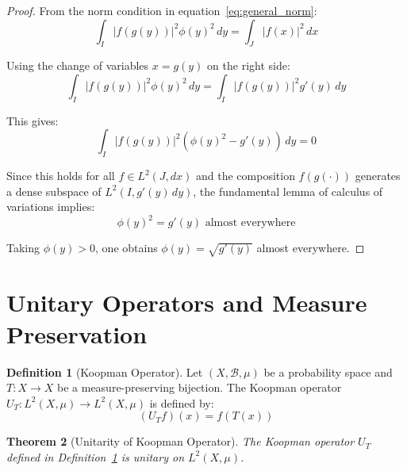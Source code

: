 \documentclass[11pt]{article}
\theoremstyle{theorem}
\newtheorem{theorem}{Theorem}[section]
\theoremstyle{definition}
\newtheorem{definition}[theorem]{Definition}
\begin{document}
\begin{proof}
From the norm condition in equation~\eqref{eq:general_norm}:
\begin{equation}
\label{eq:phi_condition}
\int_I |f(g(y))|^2 \phi(y)^2 \, dy = \int_J |f(x)|^2 \, dx
\end{equation}

Using the change of variables $x = g(y)$ on the right side:
\begin{equation}
\label{eq:phi_comparison}
\int_I |f(g(y))|^2 \phi(y)^2 \, dy = \int_I |f(g(y))|^2 g'(y) \, dy
\end{equation}

This gives:
\begin{equation}
\label{eq:phi_difference}
\int_I |f(g(y))|^2 (\phi(y)^2 - g'(y)) \, dy = 0
\end{equation}

Since this holds for all $f \in L^2(J, dx)$ and the composition $f(g(\cdot))$ generates a dense subspace of $L^2(I, g'(y) \, dy)$, the fundamental lemma of calculus of variations implies:
\begin{equation}
\label{eq:phi_ae_equal}
\phi(y)^2 = g'(y) \text{ almost everywhere}
\end{equation}

Taking $\phi(y) > 0$, one obtains $\phi(y) = \sqrt{g'(y)}$ almost everywhere.
\end{proof}

\section{Unitary Operators and Measure Preservation}

\begin{definition}[Koopman Operator]
\label{def:koopman}
Let $(X, \mathcal{B}, \mu)$ be a probability space and $T: X \to X$ be a measure-preserving bijection. The Koopman operator $U_T: L^2(X, \mu) \to L^2(X, \mu)$ is defined by:
\begin{equation}
\label{eq:koopman}
(U_T f)(x) = f(T(x))
\end{equation}
\end{definition}

\begin{theorem}[Unitarity of Koopman Operator]
\label{thm:koopman_unitary}
The Koopman operator $U_T$ defined in Definition~\ref{def:koopman} is unitary on $L^2(X, \mu)$.
\end{theorem}
\end{document}
